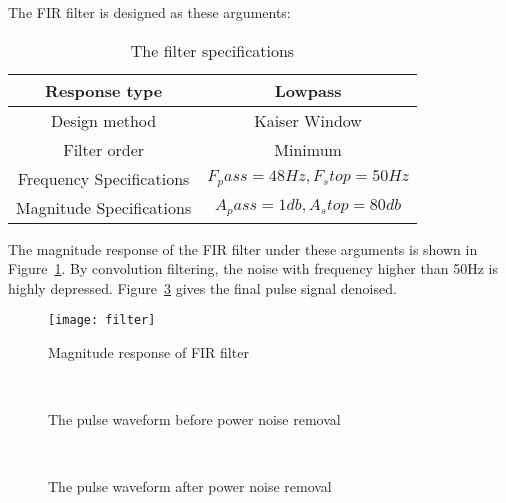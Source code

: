 The FIR filter is designed as these arguments: 
\begin{table}
    \centering
    \begin{tabular}{cc}
        Response type & Lowpass \\ \hline
        Design method & Kaiser Window \\ \hline
        Filter order & Minimum \\ \hline
        Frequency Specifications & $F_pass=48Hz, F_stop=50Hz$ \\ \hline
        Magnitude Specifications & $A_pass=1db, A_stop=80db$ \\\hline
    \end{tabular}
    \caption{The filter specifications}
    \label{tab:filter}
\end{table}
The magnitude response of the FIR filter under these arguments is
shown in Figure~\ref{fig:magnitutde}. By convolution filtering, the
noise with frequency higher than 50Hz is highly depressed.
Figure~\ref{fig:afterpower} gives the final pulse signal denoised. 
\begin{figure}[htpb]
    \begin{center}
        \texttt{[image: filter]}
    \end{center}
    \caption{Magnitude response of FIR filter}
    \label{fig:magnitutde}
\end{figure}

\begin{figure}
    \centering
    \\
    \caption{The pulse waveform before power noise removal}
    \label{fig:beforepower}
\end{figure}
\begin{figure}
    \centering
    \\
    \caption{The pulse waveform after power noise removal}
    \label{fig:afterpower}
\end{figure}

